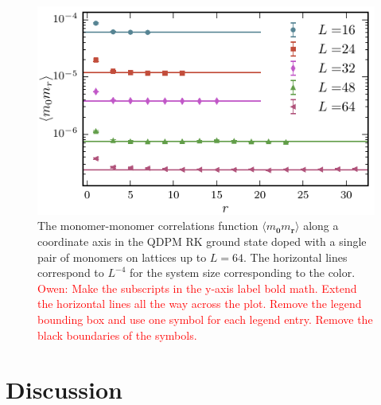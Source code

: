 \documentclass[twocolumn,prb,aps,floatfix,superscriptaddress]{revtex4-1}
\newcommand{\note}[1]{\textcolor{red}{#1}}
\begin{document}
    \begin{figure}[]
        \centering
        \includegraphics[width=1.0\columnwidth]{monomer_cor_log.pdf}
        \caption{ The monomer-monomer correlations function $\langle m_{\bm{0}} m_{\bm{r}} \rangle$ along a coordinate axis in the QDPM RK ground state doped with a single pair of monomers on lattices up to $L=64$. The horizontal lines correspond to $L^{-4}$ for the system size corresponding to the color. \note{Owen: Make the subscripts in the y-axis label bold math. Extend the horizontal lines all the way across the plot. Remove the legend bounding box and use one symbol for each legend entry. Remove the black boundaries of the symbols.}}
        \label{fig:monomer_correlations}
    \end{figure}


\section{Discussion}
\end{document}

